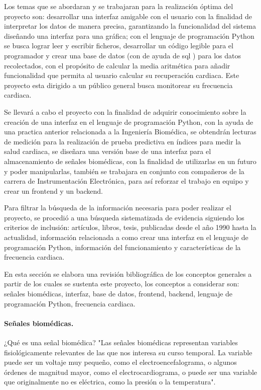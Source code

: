 \documentclass{report}
\begin{document}
		Los temas que se abordaran y se trabajaran para la realización óptima del proyecto son: desarrollar una interfaz amigable con el usuario con la finalidad de interpretar los datos de manera precisa, garantizando la funcionalidad del sistema diseñando una interfaz para una gráfica; con el lenguaje de programación Python se busca lograr leer y escribir ficheros, desarrollar un código legible para el programador y crear una base de datos (con de ayuda de sql \cite{SQL}) para los datos recolectados, con el propósito de calcular la media aritmética para añadir funcionalidad que permita al usuario calcular su recuperación cardiaca. Este proyecto esta dirigido a un público general busca monitorear su frecuencia cardiaca.  
		
		Se llevará a cabo el proyecto con la finalidad de adquirir conocimiento sobre la creación de una interfaz en el lenguaje de programación Python, con la ayuda de una practica anterior relacionada a la Ingeniería Biomédica, se obtendrán lecturas de medición para la realización de prueba predictiva en índices para medir la salud cardiaca, se diseñara una versión base de una interfaz para el almacenamiento de señales biomédicas, con la finalidad de utilizarlas en un futuro y poder manipularlas, también se trabajara en conjunto con compañeros de la carrera de Instrumentación Electrónica, para así reforzar el trabajo en equipo y crear un frontend y un backend. 
		
		Para filtrar la búsqueda de la información necesaria para poder realizar el proyecto, se procedió a una búsqueda sistematizada de evidencia siguiendo los criterios de inclusión: artículos, libros, tesis, publicadas desde el año 1990 hasta la actualidad, información relacionada a como crear una interfaz en el lenguaje de programación Python, información del funcionamiento y características de la frecuencia cardiaca. 
		
		En esta sección se elabora una revisión bibliográfica de los conceptos generales a partir de los cuales se sustenta este proyecto, los conceptos a considerar son: señales biomédicas, interfaz, base de datos, frontend, backend, lenguaje de programación Python, frecuencia cardiaca.
		
		\paragraph{Señales biomédicas.} ¿Qué es una señal biomédica? "Las señales biomédicas representan variables fisiológicamente relevantes de las que nos interesa su curso temporal. La variable puede ser un voltaje muy pequeño, como el electroencefalograma, o algunos órdenes de magnitud mayor, como el electrocardiograma, o puede ser una variable que originalmente no es eléctrica, como la presión o la temperatura"\cite{biomedica_s}. 
\end{document}
